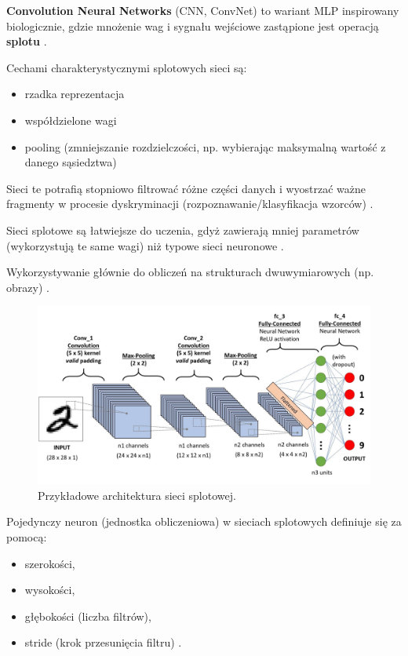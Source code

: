 \documentclass[wi]{zut}
\begin{document}
\textbf{Convolution Neural Networks} (CNN, ConvNet) to wariant MLP inspirowany biologicznie, gdzie mnożenie wag i sygnału wejściowe zastąpione jest operacją \textbf{splotu} \cite{Forczmanski2020}.

Cechami charakterystycznymi splotowych sieci są:

\begin{itemize}
    \item rzadka reprezentacja
    \item współdzielone wagi
    \item pooling (zmniejszanie rozdzielczości, np. wybierając maksymalną wartość z danego sąsiedztwa)
\end{itemize}

Sieci te potrafią stopniowo filtrować różne części danych i wyostrzać ważne fragmenty w procesie dyskryminacji (rozpoznawanie/klasyfikacja wzorców) \cite{Forczmanski2020}.

Sieci splotowe są łatwiejsze do uczenia, gdyż zawierają mniej parametrów (wykorzystują te same wagi) niż typowe sieci neuronowe \cite{Forczmanski2020}. 

Wykorzystywanie głównie do obliczeń na strukturach dwuwymiarowych (np. obrazy) \cite{Forczmanski2020}.

\begin{figure}[H]
    \centering
    \includegraphics[width=0.7\linewidth]{images/cnn.jpeg}
    \caption{Przykładowe architektura sieci splotowej.}
    \label{fig:cnn}
\end{figure}

Pojedynczy neuron (jednostka obliczeniowa) w sieciach splotowych definiuje się za pomocą:

\begin{itemize}
    \item szerokości,
    \item wysokości,
    \item głębokości (liczba filtrów),
    \item stride (krok przesunięcia filtru) \cite{Forczmanski2020}.
\end{itemize}
\end{document}
